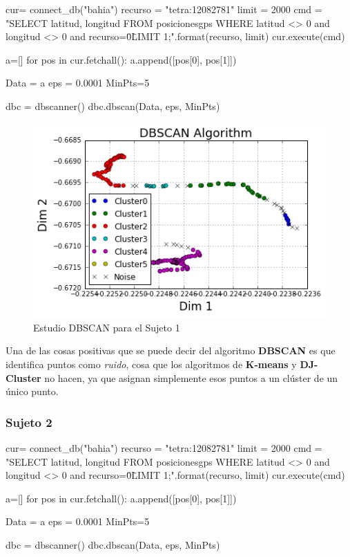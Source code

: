 \documentclass[a4paper, 12pt]{article}
\begin{document}
\begin{python}
cur= connect_db("bahia")
recurso = "tetra:12082781"
limit = 2000
cmd = "SELECT latitud, longitud 
		FROM posicionesgps 
		WHERE latitud <> 0 and longitud <> 0 and recurso=\"{0}\" 
		LIMIT {1};".format(recurso, limit)
cur.execute(cmd)

a=[]
for pos in cur.fetchall():
    a.append([pos[0], pos[1]])

Data = a
eps = 0.0001
MinPts=5

dbc = dbscanner()
dbc.dbscan(Data, eps, MinPts)
\end{python}

\begin{figure}[H]
	\includegraphics[scale=.7]{../comparativa/dbscanSujeto1.png}
	\caption{Estudio DBSCAN para el Sujeto 1}
\end{figure}

Una de las cosas positivas que se puede decir del algoritmo \textbf{DBSCAN} es que identifica puntos como \textit{ruido}, cosa que los algoritmos de \textbf{K-means} y \textbf{DJ-Cluster} no hacen, ya que asignan simplemente esos puntos a un cl\'uster de un \'unico punto.\\

\subsubsection{Sujeto 2}

\begin{python}
cur= connect_db("bahia")
recurso = "tetra:12082781"
limit = 2000
cmd = "SELECT latitud, longitud 
		FROM posicionesgps 
		WHERE latitud <> 0 and longitud <> 0 and recurso=\"{0}\" 
		LIMIT {1};".format(recurso, limit)
cur.execute(cmd)

a=[]
for pos in cur.fetchall():
    a.append([pos[0], pos[1]])

Data = a
eps = 0.0001
MinPts=5

dbc = dbscanner()
dbc.dbscan(Data, eps, MinPts)
\end{python}
\end{document}
